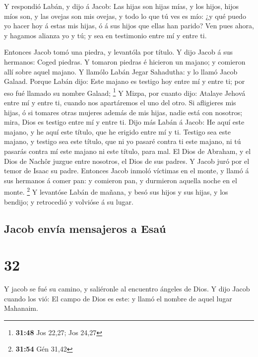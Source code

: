  Y respondió Labán, y dijo á Jacob: Las hijas son hijas
mías, y los hijos, hijos míos son, y las ovejas son mis ovejas, y todo
lo que tú ves es mío: ¿y qué puedo yo hacer hoy á estas mis hijas, ó á
sus hijos que ellas han parido?  Ven pues ahora, y hagamos
alianza yo y tú; y sea en testimonio entre mí y entre ti.

 Entonces Jacob tomó una piedra, y levantóla por título.
 Y dijo Jacob á sus hermanos: Coged piedras. Y tomaron
piedras é hicieron un majano; y comieron allí sobre aquel majano.
 Y llamólo Labán Jegar Sahadutha: y lo llamó Jacob Galaad.
 Porque Labán dijo: Este majano es testigo hoy entre mí y
entre ti; por eso fué llamado su nombre Galaad; \footnote{\textbf{31:48}
  Jos 22,27; Jos 24,27}  Y Mizpa, por cuanto dijo: Atalaye
Jehová entre mí y entre ti, cuando nos apartáremos el uno del otro.
 Si afligieres mis hijas, ó si tomares otras mujeres además
de mis hijas, nadie está con nosotros; mira, Dios es testigo entre mí y
entre ti.  Dijo más Labán á Jacob: He aquí este majano, y
he aquí este título, que he erigido entre mí y ti.  Testigo
sea este majano, y testigo sea este título, que ni yo pasaré contra ti
este majano, ni tú pasarás contra mí este majano ni este título, para
mal.  El Dios de Abraham, y el Dios de Nachôr juzgue entre
nosotros, el Dios de sus padres. Y Jacob juró por el temor de Isaac su
padre.  Entonces Jacob inmoló víctimas en el monte, y llamó
á sus hermanos á comer pan: y comieron pan, y durmieron aquella noche en
el monte. \footnote{\textbf{31:54} Gén 31,42}  Y levantóse
Labán de mañana, y besó sus hijos y sus hijas, y los bendijo; y
retrocedió y volvióse á su lugar.

\hypertarget{jacob-envuxeda-mensajeros-a-esauxfa}{%
\subsection{Jacob envía mensajeros a
Esaú}\label{jacob-envuxeda-mensajeros-a-esauxfa}}

\hypertarget{section-31}{%
\section{32}\label{section-31}}

 Y jacob se fué su camino, y saliéronle al encuentro ángeles
de Dios.  Y dijo Jacob cuando los vió: El campo de Dios es
este: y llamó el nombre de aquel lugar Mahanaim.

